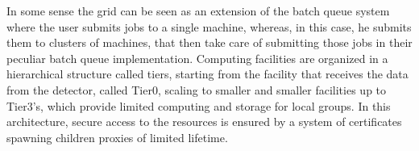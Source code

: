 In some sense the grid can be seen as an extension of the batch queue system where the user submits jobs to a single machine, whereas, in this case, he submits them to clusters of machines, that then take care of submitting those jobs in their peculiar batch queue implementation. Computing facilities are organized in a hierarchical structure called tiers, starting from the facility that receives the data from the detector, called Tier0, scaling to smaller and smaller facilities up to Tier3's, which provide limited computing and storage for local groups. In this architecture, secure access to the resources is ensured by a system of certificates spawning children proxies of limited lifetime.

